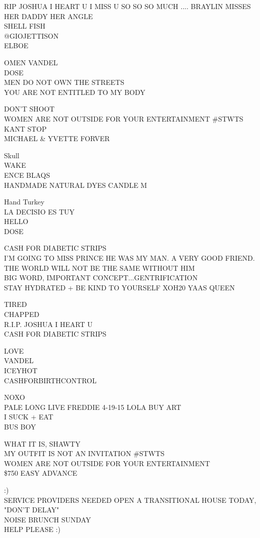 \documentclass[10pt,letterpaper]{article}
\begin{document}
RIP JOSHUA I HEART U I MISS U SO SO SO MUCH .... BRAYLIN MISSES HER DADDY HER ANGLE\\
SHELL FISH\\
@GIOJETTISON\\
ELBOE

OMEN VANDEL\\
DOSE\\
MEN DO NOT OWN THE STREETS\\
YOU ARE NOT ENTITLED TO MY BODY

DON'T SHOOT\\
WOMEN ARE NOT OUTSIDE FOR YOUR ENTERTAINMENT \#STWTS\\
KANT STOP\\
MICHAEL \& YVETTE FORVER

Skull\\
WAKE\\
ENCE BLAQS\\
HANDMADE NATURAL DYES CANDLE M

Hand Turkey\\
LA DECISIO ES TUY\\
HELLO\\
DOSE

CASH FOR DIABETIC STRIPS\\
I'M GOING TO MISS PRINCE HE WAS MY MAN.  A VERY GOOD FRIEND.  THE WORLD WILL NOT BE THE SAME WITHOUT HIM\\
BIG WORD, IMPORTANT CONCEPT...GENTRIFICATION\\
STAY HYDRATED + BE KIND TO YOURSELF XOH20 YAAS QUEEN

TIRED\\
CHAPPED\\
R.I.P. JOSHUA I HEART U\\
CASH FOR DIABETIC STRIPS

LOVE\\
VANDEL\\
ICEYHOT\\
CASHFORBIRTHCONTROL

NOXO\\
PALE LONG LIVE FREDDIE 4{-}19{-}15 LOLA BUY ART\\
I SUCK + EAT\\
BUS BOY

WHAT IT IS, SHAWTY\\
MY OUTFIT IS NOT AN INVITATION \#STWTS\\
WOMEN ARE NOT OUTSIDE FOR YOUR ENTERTAINMENT\\
\$750 EASY ADVANCE

:)\\
SERVICE PROVIDERS NEEDED OPEN A TRANSITIONAL HOUSE TODAY, "DON'T DELAY"\\
NOISE BRUNCH SUNDAY\\
HELP PLEASE :)
\end{document}
